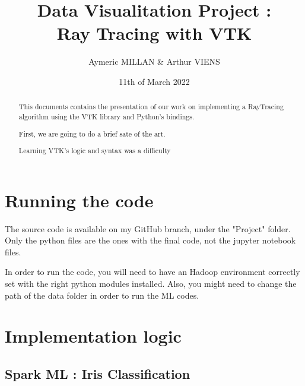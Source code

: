 \documentclass[10pt,twocolumn,letterpaper]{article}
\title{
		\huge Data Visualitation Project :\\ Ray Tracing with VTK \\
}
\author{Aymeric MILLAN \& Arthur VIENS}
\affil{Lecture given by Julien Wintz}
\date{11th of March 2022}
\begin{document}
\setlength\headheight{26pt}

\maketitle

\thispagestyle{firstpage}
\begin{abstract}
This documents contains the presentation of our work on implementing a
RayTracing algorithm using the VTK library and Python's bindings.

First, we are going to do a brief sate of the art.

Learning VTK's logic and syntax was a difficulty

\end{abstract}

\section{Running the code}
The source code is available on my GitHub branch, under the "Project" folder.
Only the python files are the ones with the final code, not the jupyter notebook
files.

In order to run the code, you will need to have an Hadoop environment correctly
set with the right python modules installed. Also, you might need to change the
path of the data folder in order to run the ML codes.

\section{Implementation logic}

    \subsection{Spark ML : Iris Classification}
\end{document}
